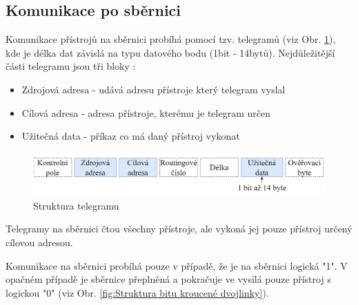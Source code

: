 \subsection{Komunikace po sběrnici}
Komunikace přístrojů na sběrnici probíhá pomocí tzv. telegramů (viz Obr. \ref{fig:Struktura telegramu}), kde je délka dat závislá na typu datového bodu  (1bit - 14bytů).
Nejdůležitější části telegramu jsou tři bloky \cite{Celkovy prehled}:
\begin{itemize}
\item Zdrojová adresa - udává adresu přístroje který telegram vyslal
\item Cílová adresa - adresa přístroje, kterému je telegram určen
\item Užitečná data - příkaz co má daný přístroj vykonat\\
\end{itemize}
\begin{figure}[!h]
  \begin{center}
    \includegraphics[scale=0.7]{obrazky/Struktura telegramu.png}
  \end{center}
  \caption[Struktura telegramu \cite{Celkovy prehled}]{Struktura telegramu \cite{Celkovy prehled}}
  \label{fig:Struktura telegramu}
\end{figure}
Telegramy na sběrnici čtou všechny přístroje, ale vykoná jej pouze přístroj určený cílovou adresou.

Komunikace na sběrnici probíhá pouze v případě, že je na sběrnici logická "1". V opačném případě je sběrnice přeplněná a pokračuje ve vysílá pouze přístroj s logickou "0" (viz Obr. \ref{fig:Struktura bitu kroucené dvojlinky}). \cite{Celkovy prehled}

